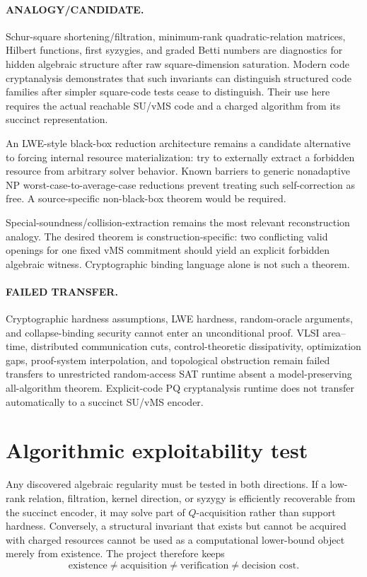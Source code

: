 \documentclass[11pt]{article}
\begin{document}
\paragraph{ANALOGY/CANDIDATE.}
Schur-square shortening/filtration, minimum-rank quadratic-relation matrices, Hilbert functions, first syzygies, and graded Betti numbers are diagnostics for hidden algebraic structure after raw square-dimension saturation. Modern code cryptanalysis demonstrates that such invariants can distinguish structured code families after simpler square-code tests cease to distinguish. Their use here requires the actual reachable SU/vMS code and a charged algorithm from its succinct representation.

An LWE-style black-box reduction architecture remains a candidate alternative to forcing internal resource materialization: try to externally extract a forbidden resource from arbitrary solver behavior. Known barriers to generic nonadaptive NP worst-case-to-average-case reductions prevent treating such self-correction as free. A source-specific non-black-box theorem would be required.

Special-soundness/collision-extraction remains the most relevant reconstruction analogy. The desired theorem is construction-specific: two conflicting valid openings for one fixed vMS commitment should yield an explicit forbidden algebraic witness. Cryptographic binding language alone is not such a theorem.

\paragraph{FAILED TRANSFER.}
Cryptographic hardness assumptions, LWE hardness, random-oracle arguments, and collapse-binding security cannot enter an unconditional proof. VLSI area--time, distributed communication cuts, control-theoretic dissipativity, optimization gaps, proof-system interpolation, and topological obstruction remain failed transfers to unrestricted random-access SAT runtime absent a model-preserving all-algorithm theorem. Explicit-code PQ cryptanalysis runtime does not transfer automatically to a succinct SU/vMS encoder.

\section*{Algorithmic exploitability test}
Any discovered algebraic regularity must be tested in both directions. If a low-rank relation, filtration, kernel direction, or syzygy is efficiently recoverable from the succinct encoder, it may solve part of \(Q\)-acquisition rather than support hardness. Conversely, a structural invariant that exists but cannot be acquired with charged resources cannot be used as a computational lower-bound object merely from existence. The project therefore keeps
\[
\text{existence}\ne\text{acquisition}\ne\text{verification}\ne\text{decision cost}.
\]
\end{document}
